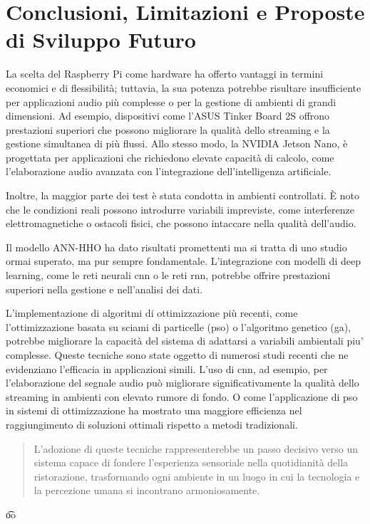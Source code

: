 
%

\chapter{Conclusioni, Limitazioni e Proposte di Sviluppo Futuro}
\label{cha:conclusioni}

La scelta del Raspberry Pi come hardware ha offerto vantaggi in termini economici e di flessibilità; tuttavia, la sua potenza  potrebbe risultare insufficiente per applicazioni audio più complesse o per la gestione di ambienti di grandi dimensioni. Ad esempio, dispositivi come l'ASUS Tinker Board 2S offrono prestazioni superiori che possono migliorare la qualità dello streaming e la gestione simultanea di più flussi. Allo stesso modo, la NVIDIA Jetson Nano, è progettata per applicazioni che richiedono elevate capacità di calcolo, come l'elaborazione audio avanzata con l'integrazione dell'intelligenza artificiale.

Inoltre, la maggior parte dei test è stata condotta in ambienti controllati. È noto che le condizioni reali possono introdurre variabili impreviste, come interferenze elettromagnetiche o ostacoli fisici, che possono intaccare nella qualità dell'audio. 

Il modello ANN-HHO ha dato risultati promettenti ma si tratta di uno studio ormai superato, ma pur sempre fondamentale. L'integrazione con modelli di deep learning, come le reti neurali \gls{cnn} o le reti \gls{rnn}, potrebbe offrire prestazioni superiori nella gestione e nell'analisi dei dati. \cite{8727654, 9717998} \cite{8325661} \cite{9680690, 9840922}

L'implementazione di algoritmi di ottimizzazione più recenti, come l'ottimizzazione basata su sciami di particelle (\gls{pso}) o l'algoritmo genetico (\gls{ga}), potrebbe migliorare la capacità del sistema di adattarsi a variabili ambientali piu' complesse. Queste tecniche sono state oggetto di numerosi studi recenti che ne evidenziano l'efficacia in applicazioni simili. L'uso di \gls{cnn}, ad esempio, per l'elaborazione del segnale audio può migliorare significativamente la qualità dello streaming in ambienti con elevato rumore di fondo. O come l'applicazione di \gls{pso} in sistemi di ottimizzazione ha mostrato una maggiore efficienza nel raggiungimento di soluzioni ottimali rispetto a metodi tradizionali. \cite{10629358, 10258355}

\newpage
\hspace{2cm}
\begin{quote}
L'adozione di queste tecniche rappresenterebbe un passo decisivo verso un sistema capace di fondere l'esperienza sensoriale nella quotidianità della ristorazione, trasformando ogni ambiente in un luogo in cui la tecnologia e la percezione umana si incontrano armoniosamente. 
\end{quote}

\centering
\t{oo}